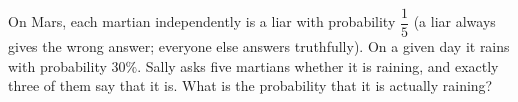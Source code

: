 On Mars, each martian independently is a liar with probability \(\dfrac{1}{5}\) (a liar always gives the wrong answer; everyone else answers truthfully). On a given day it rains with probability \(30\%\). Sally asks five martians whether it is raining, and exactly three of them say that it is. What is the probability that it is actually raining?
